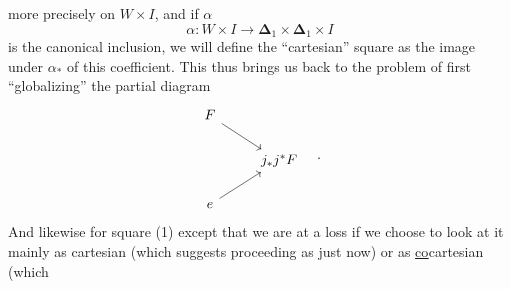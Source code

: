 \documentclass[11pt]{article}
\newcommand{\msp}[1]{\marginpar{\footnotesize [#1]}}
\newcommand{\Del}{\boldsymbol{\Delta}}
\begin{document}
\msp{page 10}

more precisely on $W \times I$, and if $\alpha$
\[ \alpha : W \times I \longrightarrow \Del_1 \times \Del_1 \times I \]
is the canonical inclusion, we will define the ``cartesian'' square as the image under $\alpha_*$ of this coefficient. This thus brings us back to the problem of first ``globalizing'' the partial diagram
\[
\begin{tikzcd}
F \arrow[dr] & \\
& j_*j^*F \\
e \arrow[ur] &
\end{tikzcd}
\quad .
\]
And likewise for square (1) except that we are at a loss if we choose to look at it mainly as cartesian (which suggests proceeding as just now) or as \underline{co}cartesian (which %
\end{document}
